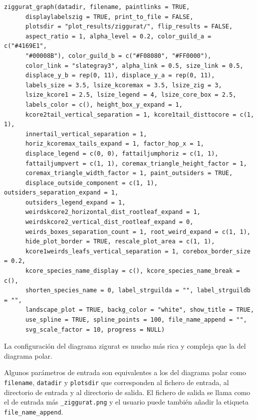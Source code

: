 \fontsize{3.5mm}{3.5mm}\selectfont
\begin{verbatim}
ziggurat_graph(datadir, filename, paintlinks = TRUE,
	  displaylabelszig = TRUE, print_to_file = FALSE,
	  plotsdir = "plot_results/ziggurat/", flip_results = FALSE,
	  aspect_ratio = 1, alpha_level = 0.2, color_guild_a = c("#4169E1",
	  "#00008B"), color_guild_b = c("#F08080", "#FF0000"),
	  color_link = "slategray3", alpha_link = 0.5, size_link = 0.5,
	  displace_y_b = rep(0, 11), displace_y_a = rep(0, 11), 
	  labels_size = 3.5, lsize_kcoremax = 3.5, lsize_zig = 3, 
	  lsize_kcore1 = 2.5, lsize_legend = 4, lsize_core_box = 2.5, 
	  labels_color = c(), height_box_y_expand = 1, 
	  kcore2tail_vertical_separation = 1, kcore1tail_disttocore = c(1, 1), 
	  innertail_vertical_separation = 1,
	  horiz_kcoremax_tails_expand = 1, factor_hop_x = 1,
	  displace_legend = c(0, 0), fattailjumphoriz = c(1, 1),
	  fattailjumpvert = c(1, 1), coremax_triangle_height_factor = 1,
	  coremax_triangle_width_factor = 1, paint_outsiders = TRUE,
	  displace_outside_component = c(1, 1), outsiders_separation_expand = 1,
	  outsiders_legend_expand = 1,
	  weirdskcore2_horizontal_dist_rootleaf_expand = 1,
	  weirdskcore2_vertical_dist_rootleaf_expand = 0,
	  weirds_boxes_separation_count = 1, root_weird_expand = c(1, 1),
	  hide_plot_border = TRUE, rescale_plot_area = c(1, 1),
	  kcore1weirds_leafs_vertical_separation = 1, corebox_border_size = 0.2,
	  kcore_species_name_display = c(), kcore_species_name_break = c(),
	  shorten_species_name = 0, label_strguilda = "", label_strguildb = "",
	  landscape_plot = TRUE, backg_color = "white", show_title = TRUE,
	  use_spline = TRUE, spline_points = 100, file_name_append = "",
	  svg_scale_factor = 10, progress = NULL)
\end{verbatim}
\normalsize

La configuración del diagrama zigurat es mucho más rica y compleja que la del diagrama polar. 
%

Algunos parámetros de entrada son equivalentes a los del  diagrama polar como \texttt{filename}, \texttt{datadir} y \texttt{plotsdir} que 
corresponden al fichero de entrada, al directorio de entrada y al directorio de salida. El fichero de salida se llama
como el de entrada más \texttt{\_ziggurat.png} y el usuario puede también añadir la etiqueta \texttt{file\_name\_append}.

